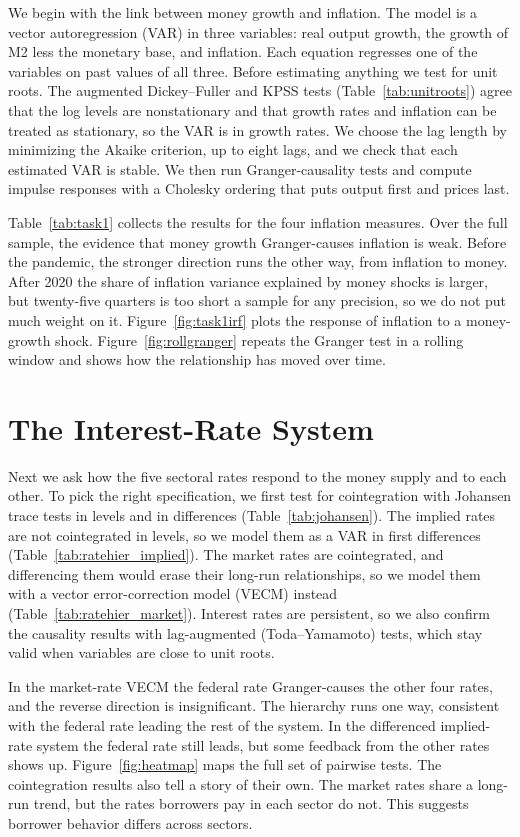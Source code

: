 We begin with the link between money growth and inflation. The model is a vector autoregression (VAR) in three variables: real output growth, the growth of M2 less the monetary base, and inflation. Each equation regresses one of the variables on past values of all three. Before estimating anything we test for unit roots. The augmented Dickey--Fuller and KPSS tests (Table~\ref{tab:unitroots}) agree that the log levels are nonstationary and that growth rates and inflation can be treated as stationary, so the VAR is in growth rates. We choose the lag length by minimizing the Akaike criterion, up to eight lags, and we check that each estimated VAR is stable. We then run Granger-causality tests and compute impulse responses with a Cholesky ordering that puts output first and prices last.

Table~\ref{tab:task1} collects the results for the four inflation measures. Over the full sample, the evidence that money growth Granger-causes inflation is weak. Before the pandemic, the stronger direction runs the other way, from inflation to money. After 2020 the share of inflation variance explained by money shocks is larger, but twenty-five quarters is too short a sample for any precision, so we do not put much weight on it. Figure~\ref{fig:task1irf} plots the response of inflation to a money-growth shock. Figure~\ref{fig:rollgranger} repeats the Granger test in a rolling window and shows how the relationship has moved over time.

\section{The Interest-Rate System}
\label{sec:rates}

Next we ask how the five sectoral rates respond to the money supply and to each other. To pick the right specification, we first test for cointegration with Johansen trace tests in levels and in differences (Table~\ref{tab:johansen}). The implied rates are not cointegrated in levels, so we model them as a VAR in first differences (Table~\ref{tab:ratehier_implied}). The market rates are cointegrated, and differencing them would erase their long-run relationships, so we model them with a vector error-correction model (VECM) instead (Table~\ref{tab:ratehier_market}). Interest rates are persistent, so we also confirm the causality results with lag-augmented (Toda--Yamamoto) tests, which stay valid when variables are close to unit roots.

In the market-rate VECM the federal rate Granger-causes the other four rates, and the reverse direction is insignificant. The hierarchy runs one way, consistent with the federal rate leading the rest of the system. In the differenced implied-rate system the federal rate still leads, but some feedback from the other rates shows up. Figure~\ref{fig:heatmap} maps the full set of pairwise tests. The cointegration results also tell a story of their own. The market rates share a long-run trend, but the rates borrowers pay in each sector do not. This suggests borrower behavior differs across sectors.

